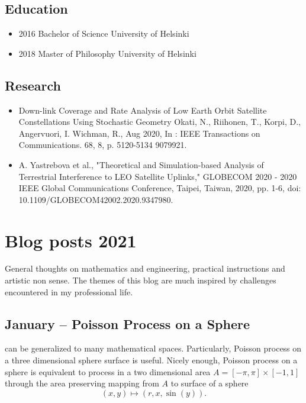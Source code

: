 \documentclass{article}
\begin{document}
        \subsection{Education}
        \begin{itemize}
        \item 2016 Bachelor of Science University of Helsinki\\
        \item 2018 Master of Philosophy University of Helsinki
        \end{itemize}
        \subsection{Research}

        \begin{itemize}
        \item Down-link Coverage and Rate Analysis of Low Earth Orbit Satellite Constellations Using Stochastic Geometry
          Okati, N., Riihonen, T., Korpi, D., Angervuori, I. Wichman, R., Aug 2020, In : IEEE Transactions on Communications. 68, 8, p. 5120-5134 9079921.\\
        \item A. Yastrebova et al., "Theoretical and Simulation-based Analysis of Terrestrial Interference to LEO Satellite Uplinks," GLOBECOM 2020 - 2020 IEEE Global Communications Conference, Taipei, Taiwan, 2020, pp. 1-6, doi: 10.1109/GLOBECOM42002.2020.9347980.
        \end{itemize}


        \section{Blog posts 2021}
        General thoughts on mathematics and engineering, practical instructions and artistic non sense. The themes of this blog are much inspired by challenges encountered in my professional life.

        \subsection{January – Poisson Process on a Sphere}
         can be generalized to many mathematical spaces. Particularly, Poisson process on a three dimensional sphere surface is useful. Nicely enough, Poisson process on a sphere is equivalent to process in a two dimensional area $ A = [-\pi,\pi] \times [-1,1]$ through the area preserving mapping from $A$ to surface of a sphere
        \begin{equation}
          (x,y) \mapsto (r,x,\sin(y)) \nonumber.
        \end{equation}
\end{document}
